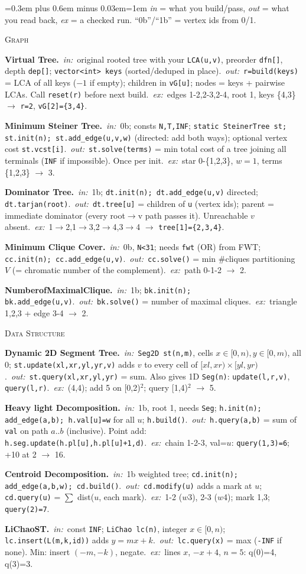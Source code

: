 {\footnotesize\spaceskip=0.3em plus 0.6em minus 0.03em\emergencystretch=1em\setlength{\parskip}{0.3pt}\setlength{\parindent}{0pt}%
\def\bb#1{\par\textbf{#1.}~}%
\def\io{\textit{in:}~}\def\oo{~\textit{out:}~}\def\ex{~\textit{ex:}~}%
\textit{in} = what you build/pass, \textit{out} = what you read back, \textit{ex} = a checked run. ``0b''/``1b'' = vertex ids from 0/1.

\textsc{Graph}
\bb{Virtual Tree}\io original rooted tree with your \texttt{LCA(u,v)}, preorder \texttt{dfn[]}, depth \texttt{dep[]}; \texttt{vector<int> keys} (sorted/deduped in place).\oo \texttt{r=build(keys)} = LCA of all keys ($-1$ if empty); children in \texttt{vG[u]}; nodes = keys + pairwise LCAs. Call \texttt{reset(r)} before next build.\ex edges 1-2,2-3,2-4, root 1, keys \{4,3\} $\to$ \texttt{r=2}, \texttt{vG[2]=\{3,4\}}.
\bb{Minimum Steiner Tree}\io 0b; consts \texttt{N,T,INF}; \texttt{static SteinerTree st; st.init(n); st.add\_edge(u,v,w)} (directed: add both ways); optional vertex cost \texttt{st.vcst[i]}.\oo \texttt{st.solve(terms)} = min total cost of a tree joining all terminals (\texttt{INF} if impossible). Once per init.\ex star 0-\{1,2,3\}, $w=1$, terms \{1,2,3\} $\to$ 3.
\bb{Dominator Tree}\io 1b; \texttt{dt.init(n); dt.add\_edge(u,v)} directed; \texttt{dt.tarjan(root)}.\oo \texttt{dt.tree[u]} = children of \texttt{u} (vertex ids); parent = immediate dominator (every root$\to$v path passes it). Unreachable $v$ absent.\ex 1$\to$2,1$\to$3,2$\to$4,3$\to$4 $\to$ \texttt{tree[1]=\{2,3,4\}}.
\bb{Minimum Clique Cover}\io 0b, \texttt{N<31}; needs \texttt{fwt} (OR) from FWT; \texttt{cc.init(n); cc.add\_edge(u,v)}.\oo \texttt{cc.solve()} = min \#cliques partitioning $V$ (= chromatic number of the complement).\ex path 0-1-2 $\to$ 2.
\bb{NumberofMaximalClique}\io 1b; \texttt{bk.init(n); bk.add\_edge(u,v)}.\oo \texttt{bk.solve()} = number of maximal cliques.\ex triangle 1,2,3 + edge 3-4 $\to$ 2.

\textsc{Data Structure}
\bb{Dynamic 2D Segment Tree}\io \texttt{Seg2D st(n,m)}, cells $x\in[0,n),y\in[0,m)$, all 0; \texttt{st.update(xl,xr,yl,yr,v)} adds $v$ to every cell of $[xl,xr)\times[yl,yr)$.\oo \texttt{st.query(xl,xr,yl,yr)} = sum. Also gives 1D \texttt{Seg(n)}: \texttt{update(l,r,v)}, \texttt{query(l,r)}.\ex (4,4); add 5 on [0,2)$^2$; query [1,4)$^2$ $\to$ 5.
\bb{Heavy light Decomposition}\io 1b, root 1, needs \texttt{Seg}; \texttt{h.init(n); add\_edge(a,b); h.val[u]=w} for all $u$; \texttt{h.build()}.\oo \texttt{h.query(a,b)} = sum of \texttt{val} on path $a..b$ (inclusive). Point add: \texttt{h.seg.update(h.pl[u],h.pl[u]+1,d)}.\ex chain 1-2-3, val=$u$: \texttt{query(1,3)=6}; +10 at 2 $\to$ 16.
\bb{Centroid Decomposition}\io 1b weighted tree; \texttt{cd.init(n); add\_edge(a,b,w); cd.build()}.\oo \texttt{cd.modify(u)} adds a mark at $u$; \texttt{cd.query(u)} = $\sum$ dist($u$, each mark).\ex 1-2 ($w$3), 2-3 ($w$4); mark 1,3; \texttt{query(2)=7}.
\bb{LiChaoST}\io const \texttt{INF}; \texttt{LiChao lc(n)}, integer $x\in[0,n)$; \texttt{lc.insert(L(m,k,id))} adds $y=mx+k$.\oo \texttt{lc.query(x)} = max (\texttt{-INF} if none). Min: insert $(-m,-k)$, negate.\ex lines $x$, $-x+4$, $n=5$: q(0)=4, q(3)=3.

}
